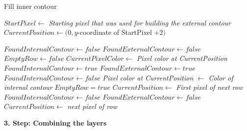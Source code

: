 \documentclass[thesis.tex]{subfiles}
\begin{document}
 \begin{algorithm}
   \caption{Fill inner contour}
\label{scan_pseudocode}
    \begin{algorithmic}[1]
      \State ${StartPixel\gets}$ \textit{Starting pixel that was used for building the external contour}
        \State ${CurrentPosition\gets} (0, y$-coordinate of StartPixel $+ 2)$

\State ${FoundInternalContour\gets false}$
\State ${FoundExternalContour\gets false}$
\State ${EmptyRow\gets false}$
\State
\State ${CurrentPixelColor \gets }$ \textit{Pixel color at CurrentPosition}
\State
					\State ${FoundInternalContour\gets true}$
				\State ${FoundExternalContour\gets true}$
				\State ${FoundInternalContour\gets false}$
				\Else
						\State \textit{Pixel color at CurrentPosition} ${\gets}$ \textit{Color of internal contour}
					\EndIf
				\EndIf
\State
			\State ${EmptyRow = true}$
		\Else
			\State ${CurrentPosition \gets}$ \textit{First pixel of next row}
			\State ${FoundInternalContour\gets false}$
			\State ${FoundExternalContour\gets false}$
		\EndIf
		\Else
		\State ${CurrentPosition} \gets$ \textit{next pixel of row}
		\EndIf
        \EndWhile
      


\end{algorithmic}
\end{algorithm}

\textbf{3. Step: Combining the layers}
\end{document}

